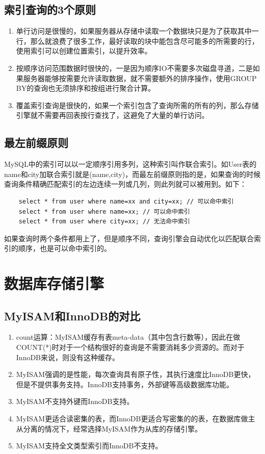 \documentclass[a4paper]{report}
\begin{document}
\subsection{索引查询的3个原则}
\begin{enumerate}
    \item 单行访问是很慢的，如果服务器从存储中读取一个数据块只是为了获取其中一行，那么就浪费了很多工作，最好读取的块中能包含尽可能多的所需要的行，使用索引可以创建位置索引，以提升效率。
    \item 按顺序访问范围数据时很快的，一是因为顺序IO不需要多次磁盘寻道，二是如果服务器能够按需要允许读取数据，就不需要额外的排序操作，使用GROUP BY的查询也无须排序和按组进行聚合计算。
    \item 覆盖索引查询是很快的，如果一个索引包含了查询所需的所有的列，那么存储引擎就不需要再回表按行查找了，这避免了大量的单行访问。
\end{enumerate}

\subsection{最左前缀原则}
MySQL中的索引可以以一定顺序引用多列，这种索引叫作联合索引。如User表的name和city加联合索引就是(name,city)，而最左前缀原则指的是，如果查询的时候查询条件精确匹配索引的左边连续一列或几列，则此列就可以被用到。如下：
\begin{verbatim}
    select * from user where name=xx and city=xx; // 可以命中索引
    select * from user where name=xx; // 可以命中索引
    select * from user where city=xx; // 无法命中索引
\end{verbatim}
如果查询时两个条件都用上了，但是顺序不同，查询引擎会自动优化以匹配联合索引的顺序，也是可以命中索引的。

\section{数据库存储引擎}
\subsection{MyISAM和InnoDB的对比}
\begin{enumerate}
    \item count运算：MyISAM缓存有表meta-data（其中包含行数等），因此在做COUNT(*)时对于一个结构很好的查询是不需要消耗多少资源的。而对于InnoDB来说，则没有这种缓存。
    \item MyISAM强调的是性能，每次查询具有原子性，其执行速度比InnoDB更快，但是不提供事务支持。InnoDB支持事务，外部键等高级数据库功能。
    \item MyISAM不支持外键而InnoDB支持。
    \item MyISAM更适合读密集的表，而InnoDB更适合写密集的的表，在数据库做主从分离的情况下，经常选择MyISAM作为从库的存储引擎。
    \item MyISAM支持全文类型索引而InnoDB不支持。
\end{enumerate}
\end{document}
